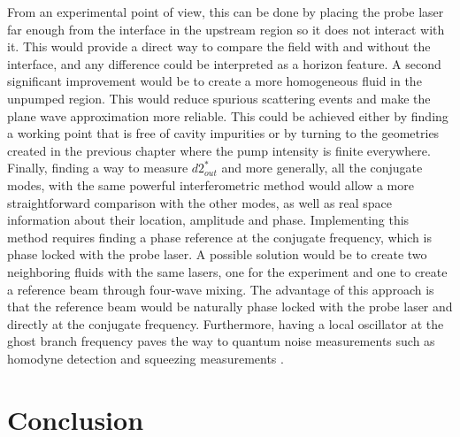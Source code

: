 From an experimental point of view, this can be done by placing the probe laser far enough from the interface in the upstream region so it does not interact with it. This would provide
a direct way to compare the field with and without the interface, and any difference could be interpreted as a horizon feature. A second significant 
improvement would be to create a more homogeneous fluid in the unpumped region. This would reduce spurious scattering events and make the plane wave approximation more reliable.
This could be achieved either by finding a working point that is free of cavity impurities or by turning to the geometries created in the previous chapter where the pump intensity is finite everywhere.
Finally, finding a way to measure $d2_{out}^*$ and more generally, all the conjugate modes, with the same powerful interferometric method would allow a more straightforward comparison with the other modes, as well as real space information about their location, amplitude and phase. Implementing this method requires finding a phase reference at the conjugate frequency, which is phase locked with the probe laser. A possible solution would be to create two neighboring fluids with the same lasers, one for the experiment and one to create a reference beam through four-wave mixing. The advantage of this approach is that the reference beam would be naturally phase locked with the probe laser and directly at the conjugate frequency.
Furthermore, having a local oscillator at the ghost branch frequency paves the way to quantum noise measurements such as homodyne detection and squeezing measurements \cite{agullo_symplectic_2022}.



\section{Conclusion}
\label{sec:conclusion}


